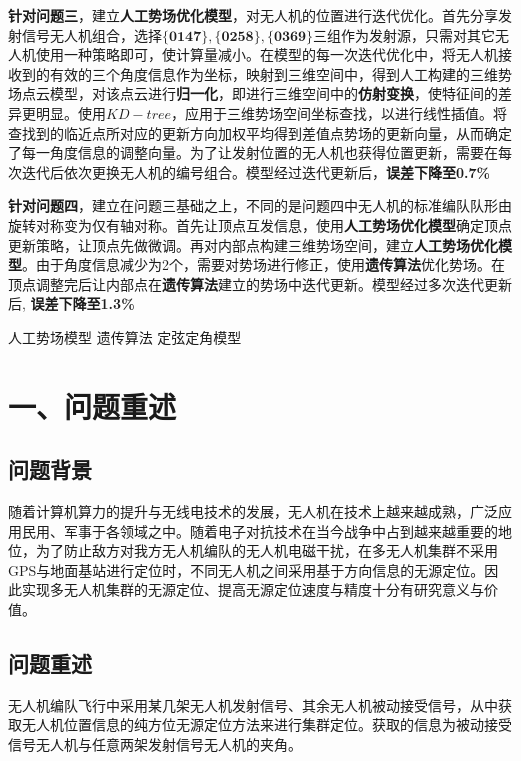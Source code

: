\documentclass{my_paper}
\begin{document}
\textbf{针对问题三}，建立\textbf{人工势场优化模型}，对无人机的位置进行迭代优化。首先分享发射信号无人机组合，选择$\mathbf{\{0147\},\{0258\},\{0369\}}$三组作为发射源，只需对其它无人机使用一种策略即可，使计算量减小。在模型的每一次迭代优化中，将无人机接收到的有效的三个角度信息作为坐标，映射到三维空间中，得到人工构建的三维势场点云模型，对该点云进行\textbf{归一化}，即进行三维空间中的\textbf{仿射变换}，使特征间的差异更明显。使用\textbf{$KD-tree$}，应用于三维势场空间坐标查找，以进行线性插值。将查找到的临近点所对应的更新方向加权平均得到差值点势场的更新向量，从而确定了每一角度信息的调整向量。为了让发射位置的无人机也获得位置更新，需要在每次迭代后依次更换无人机的编号组合。模型经过迭代更新后，\textbf{误差下降至0.7\%}

\textbf{针对问题四}，建立在问题三基础之上，不同的是问题四中无人机的标准编队队形由旋转对称变为仅有轴对称。首先让顶点互发信息，使用\textbf{人工势场优化模型}确定顶点更新策略，让顶点先做微调。再对内部点构建三维势场空间，建立\textbf{人工势场优化模型}。由于角度信息减少为2个，需要对势场进行修正，使用\textbf{遗传算法}优化势场。在顶点调整完后让内部点在\textbf{遗传算法}建立的势场中迭代更新。模型经过多次迭代更新后, \textbf{误差下降至1.3\%}\\

\begin{guanjianci}
    人工势场模型 \quad 遗传算法 \quad 定弦定角模型
\end{guanjianci}

\newpage
\section{一、问题重述}
\subsection{问题背景}
随着计算机算力的提升与无线电技术的发展，无人机在技术上越来越成熟，广泛应用民用、军事于各领域之中。\cite{gaoqingfeng}随着电子对抗技术在当今战争中占到越来越重要的地位，为了防止敌方对我方无人机编队的无人机电磁干扰，在多无人机集群不采用GPS与地面基站进行定位时，不同无人机之间采用基于方向信息的无源定位。因此实现多无人机集群的无源定位、提高无源定位速度与精度十分有研究意义与价值。

\subsection{问题重述}
无人机编队飞行中采用某几架无人机发射信号、其余无人机被动接受信号，从中获取无人机位置信息的纯方位无源定位方法来进行集群定位。获取的信息为被动接受信号无人机与任意两架发射信号无人机的夹角。
\end{document}
